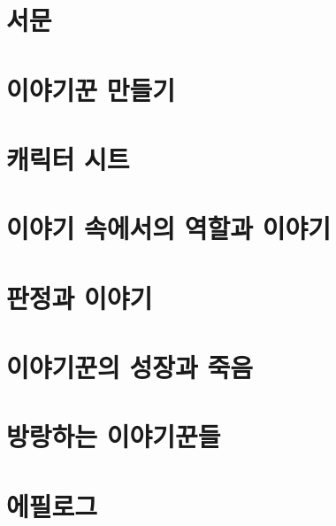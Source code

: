 \documentclass{report}
\begin{document}
	\parttoc
	
	\chapter{서문}
	
	
	\chapter{이야기꾼 만들기}
	
	
	\hypertarget{lite-sheets}{}
	\chapter{캐릭터 시트}
	
	
	\chapter{이야기 속에서의 역할과 이야기}
	
	
	\chapter{판정과 이야기}
	
	
	\chapter{이야기꾼의 성장과 죽음}
	
	
	\hypertarget{wandering-storytellers}{}
	\chapter{방랑하는 이야기꾼들}
	
	
	\chapter{에필로그}
	
\end{document}
